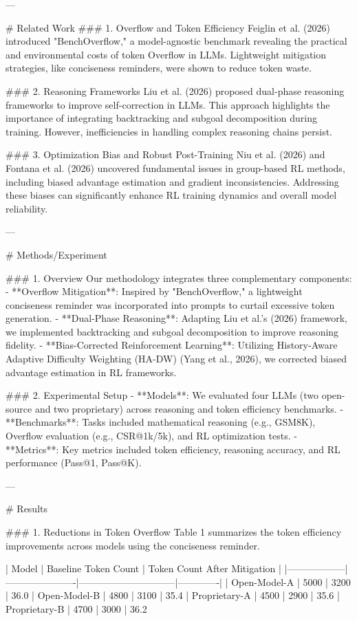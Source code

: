 ---

# Related Work  
### 1. Overflow and Token Efficiency  
Feiglin et al. (2026) introduced "BenchOverflow," a model-agnostic benchmark revealing the practical and environmental costs of token Overflow in LLMs. Lightweight mitigation strategies, like conciseness reminders, were shown to reduce token waste. 

### 2. Reasoning Frameworks  
Liu et al. (2026) proposed dual-phase reasoning frameworks to improve self-correction in LLMs. This approach highlights the importance of integrating backtracking and subgoal decomposition during training. However, inefficiencies in handling complex reasoning chains persist. 

### 3. Optimization Bias and Robust Post-Training  
Niu et al. (2026) and Fontana et al. (2026) uncovered fundamental issues in group-based RL methods, including biased advantage estimation and gradient inconsistencies. Addressing these biases can significantly enhance RL training dynamics and overall model reliability.

---

# Methods/Experiment  

### 1. Overview  
Our methodology integrates three complementary components:  
- **Overflow Mitigation**: Inspired by "BenchOverflow," a lightweight conciseness reminder was incorporated into prompts to curtail excessive token generation.  
- **Dual-Phase Reasoning**: Adapting Liu et al.'s (2026) framework, we implemented backtracking and subgoal decomposition to improve reasoning fidelity.  
- **Bias-Corrected Reinforcement Learning**: Utilizing History-Aware Adaptive Difficulty Weighting (HA-DW) (Yang et al., 2026), we corrected biased advantage estimation in RL frameworks.

### 2. Experimental Setup  
- **Models**: We evaluated four LLMs (two open-source and two proprietary) across reasoning and token efficiency benchmarks.  
- **Benchmarks**: Tasks included mathematical reasoning (e.g., GSM8K), Overflow evaluation (e.g., CSR@1k/5k), and RL optimization tests.  
- **Metrics**: Key metrics included token efficiency, reasoning accuracy, and RL performance (Pass@1, Pass@K).  

---

# Results  

### 1. Reductions in Token Overflow  
Table 1 summarizes the token efficiency improvements across models using the conciseness reminder.

| Model           | Baseline Token Count | Token Count After Mitigation | %
|------------------|----------------------|------------------------------|-------------|
| Open-Model-A    | 5000                | 3200                        | 36.0%
| Open-Model-B    | 4800                | 3100                        | 35.4%
| Proprietary-A   | 4500                | 2900                        | 35.6%
| Proprietary-B   | 4700                | 3000                        | 36.2%

